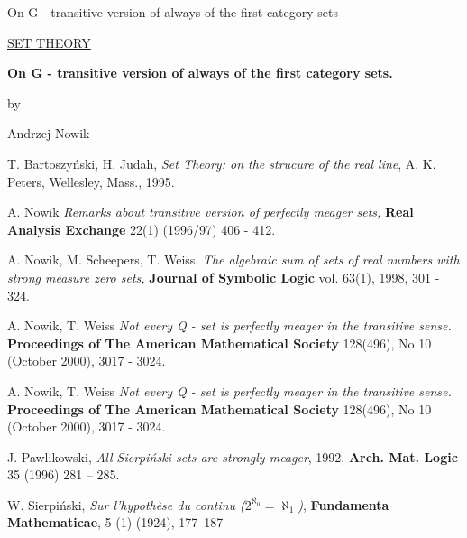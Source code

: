{On G - transitive version of always of the first category sets}



{\parindent 12cm
\underline{\small SET THEORY}
}

\begin{center}{\bf \large
On G - transitive version of always of the first category sets.
}
\end{center}
\smallskip
\begin{center}
by
\end{center}
\smallskip
\begin{center}{\large Andrzej Nowik }
\end{center}
\bigskip
\begin{abstract}

  We study the $G-$ invariant version of always of
the first category sets.
  This notion is a generalization of the notion of
$\afcp$ sets.


\end{abstract}

\bigskip
\bigskip
\bigskip


\begin{thebibliography}{10}

 T. Bartoszy\'nski, H. Judah, {\it Set Theory: on the
strucure of the real line}, A. K. Peters, Wellesley, Mass., 1995.

A. Nowik
{\em Remarks about transitive version of perfectly
meager sets,}
{\bf Real Analysis Exchange} 22(1) (1996/97) 406 - 412.

A. Nowik, M. Scheepers, T. Weiss.
{\em The algebraic sum of sets of
    real numbers with strong measure zero sets,}
{\bf Journal of Symbolic Logic} vol. 63(1), 1998, 301 - 324.

A. Nowik, T. Weiss
{\em Not every Q - set is perfectly meager in the transitive sense.}
{\bf Proceedings of The American Mathematical Society} 128(496), No 10
(October 2000), 3017 - 3024.

A. Nowik, T. Weiss
{\em Not every Q - set is perfectly meager in the transitive sense.}
{\bf Proceedings of The American Mathematical Society} 128(496), No 10
(October 2000), 3017 - 3024.

J. Pawlikowski, {\em All Sierpi\'nski sets are strongly
meager}, 1992, {\bf Arch. Mat. Logic} 35 (1996) 281 -- 285.

W. Sierpi\'nski, {\em Sur l'hypoth\`{e}se du continu 
($2^{\aleph_0} = \aleph_1$)}, {\bf Fundamenta Mathematicae}, 5 (1)
(1924), 177–187

\end{thebibliography}

